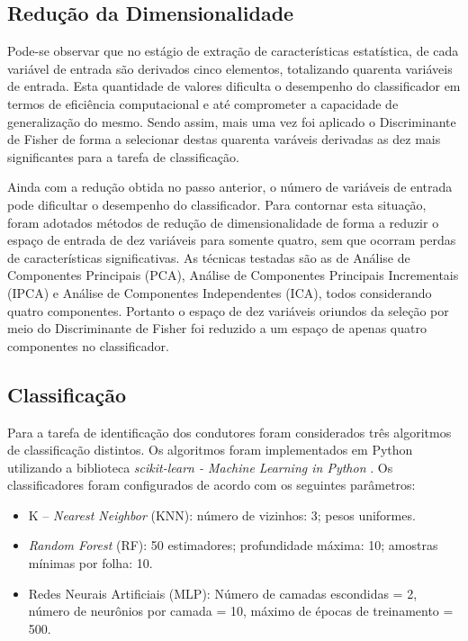 \subsection{Redução da Dimensionalidade}

Pode-se observar que no estágio de extração de características estatística, de cada variável de entrada são derivados cinco elementos, totalizando quarenta variáveis de entrada. Esta quantidade de valores dificulta o desempenho do classificador em termos de eficiência computacional e até comprometer a capacidade de generalização do mesmo. Sendo assim, mais uma vez foi aplicado o Discriminante de Fisher de forma a selecionar destas quarenta varáveis derivadas as dez mais significantes para a tarefa de classificação.

Ainda com a redução obtida no passo anterior, o número de variáveis de entrada pode dificultar o desempenho do classificador. Para contornar esta situação, foram adotados métodos de redução de dimensionalidade de forma a reduzir o espaço de entrada de dez variáveis para somente quatro, sem que ocorram perdas de características significativas. As técnicas testadas são as de Análise de Componentes Principais (PCA), Análise de Componentes Principais Incrementais (IPCA) e Análise de Componentes Independentes (ICA), todos considerando quatro componentes. Portanto o espaço de dez variáveis oriundos da seleção por meio do Discriminante de Fisher foi reduzido a um espaço de apenas quatro componentes no classificador.

\subsection{Classificação}

Para a tarefa de identificação dos condutores foram considerados três algoritmos de classificação distintos. Os algoritmos foram implementados em Python utilizando a biblioteca \textit{scikit-learn - Machine Learning in Python} \cite{scikit-learn}. Os classificadores foram configurados de acordo com os seguintes parâmetros:

\begin{itemize}
	\item K – \textit{Nearest Neighbor} (KNN): número de vizinhos: 3; pesos uniformes.
	
	\item \textit{Random Forest} (RF): 50 estimadores; profundidade máxima: 10; amostras mínimas por folha: 10.
	
	\item Redes Neurais Artificiais (MLP): Número de camadas escondidas = 2, número de neurônios por camada = 10, máximo de épocas de treinamento = 500.
	
\end{itemize}

